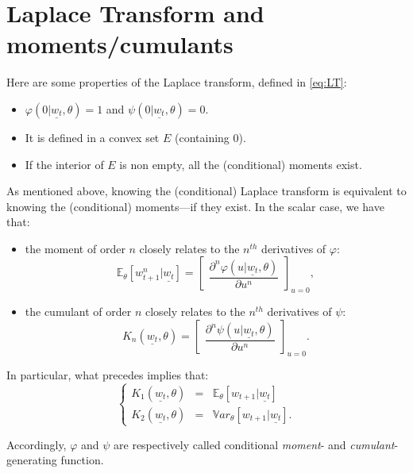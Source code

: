 \documentclass[
  12pt,
]{book}
\providecommand{\tightlist}{%
  \setlength{\itemsep}{0pt}\setlength{\parskip}{0pt}}
\theoremstyle{definition}
\theoremstyle{definition}
\theoremstyle{definition}
\theoremstyle{definition}
\theoremstyle{remark}
\begin{document}
\hypertarget{AffineLaplace}{%
\section{Laplace Transform and moments/cumulants}\label{AffineLaplace}}

Here are some properties of the Laplace transform, defined in \eqref{eq:LT}:

\begin{itemize}
\tightlist
\item
  \(\varphi(0|\underline{w_t},\theta) = 1\) and \(\psi(0|\underline{w_t},\theta)=0\).
\item
  It is defined in a convex set \(E\) (containing \(0\)).
\item
  If the interior of \(E\) is non empty, all the (conditional) moments exist.
\end{itemize}

As mentioned above, knowing the (conditional) Laplace transform is equivalent to knowing the (conditional) moments---if they exist. In the scalar case, we have that:

\begin{itemize}
\tightlist
\item
  the moment of order \(n\) closely relates to the \(n^{th}\) derivatives of \(\varphi\):
  \[
  \mathbb{E}_{\theta}[w^n_{t+1}|\underline{w_t}] = \left[ \begin{array}{l}  \dfrac{\partial^n
  \varphi(u|\underline{w_t},\theta)}{\partial u^n}
  \end{array} \right]_{u=0},
  \]
\item
  the cumulant of order \(n\) closely relates to the \(n^{th}\) derivatives of \(\psi\):
  \[
  K_n(\underline{w_t},\theta) = \left[ \begin{array}{l}  \dfrac{\partial^n
  \psi(u|\underline{w_t},\theta)}{\partial u^n}
  \end{array} \right]_{u=0}.
  \]
\end{itemize}

In particular, what precedes implies that:
\[
\left\{
\begin{array}{ccc}
K_1(\underline{w_t},\theta) &=& \mathbb{E}_{\theta}[w_{t+1}|\underline{w_t}]\\
K_2(\underline{w_t}, \theta) &=& \mathbb{V}ar_{\theta}[w_{t+1}|\underline{w_t}].
\end{array}
\right.
\]

Accordingly, \(\varphi\) and \(\psi\) are respectively called conditional \emph{moment}- and \emph{cumulant}-generating function.
\end{document}
